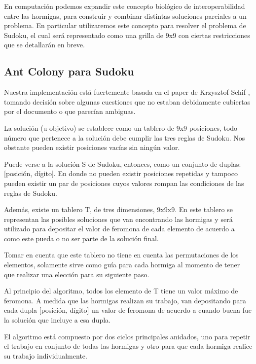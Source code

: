 \documentclass[a4paper,spanish]{article}
\begin{document}
En computación podemos expandir este concepto biológico de interoperabilidad entre las hormigas,
para construir y combinar distintas soluciones parciales a un problema. En particular utilizaremos
este concepto para resolver el problema de Sudoku, el cual será representado como una grilla
de 9x9 con ciertas restricciones que se detallarán en breve.

\clearpage

\subsection{Ant Colony para Sudoku}

Nuestra implementación está fuertemente basada en el paper de Krzysztof Schif \cite{ant_colony},
tomando decisión sobre algunas cuestiones que no estaban debidamente cubiertas por el documento
o que parecían ambiguas.

La solución (u objetivo) se establece como un tablero de 9x9 posiciones, todo número que
pertenece a la solución debe cumplir las tres reglas de Sudoku. Nos obstante pueden existir
posiciones vacías sin ningún valor.

Puede verse a la solución S de Sudoku, entonces, como un conjunto de duplas: [posición, dígito].
En donde no pueden existir posiciones repetidas y tampoco pueden existir un par de posiciones
cuyos valores rompan las condiciones de las reglas de Sudoku.

Además, existe un tablero T, de tres dimensiones, 9x9x9. En este tablero se representan las
posibles soluciones que van encontrando las hormigas y será utilizado para depositar el valor
de feromona de cada elemento de acuerdo a como este pueda o no ser parte de la solución final.

Tomar en cuenta que este tablero no tiene en cuenta las permutaciones de los elementos,
solamente sirve como guía para cada hormiga al momento de tener que realizar una elección
para su siguiente paso.

Al principio del algoritmo, todos los elemento de T tiene un valor máximo de feromona. A medida
que las hormigas realizan su trabajo, van depositando para cada dupla [posición, dígito] un valor
de feromona de acuerdo a cuando buena fue la solución que incluye a esa dupla.

El algoritmo está compuesto por dos ciclos principales anidados, uno para repetir el trabajo en
conjunto de todas las hormigas y otro para que cada hormiga realice su trabajo individualmente.
\end{document}
